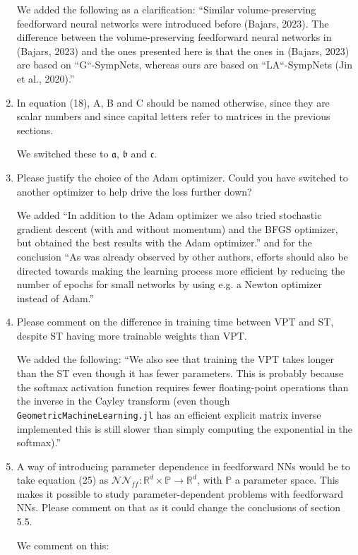 \documentclass{article}
\begin{document}
\begin{enumerate}
        {\color{mred} We added the following as a clarification: ``Similar volume-preserving feedforward neural networks were introduced before (Bajars, 2023). The difference between the volume-preserving feedforward neural networks in (Bajars, 2023) and the ones presented here is that the ones in (Bajars, 2023) are based on ``G``-SympNets, whereas ours are based on ``LA``-SympNets (Jin et al., 2020).''}
\item In equation (18), A, B and C should be named otherwise, since they are scalar numbers and since capital letters refer to matrices in the previous sections.

        {\color{mred} We switched these to $\mathfrak{a}$, $\mathfrak{b}$ and $\mathfrak{c}$.}
\item Please justify the choice of the Adam optimizer. Could you have switched to another optimizer to help drive the loss further down?

        {\color{mred} We added ``In addition to the Adam optimizer we also tried stochastic gradient descent (with and without momentum) and the BFGS optimizer, but obtained the best results with the Adam optimizer.'' and for the conclusion ``As was already observed by other authors, efforts should also be directed towards making the learning process more efficient by reducing the number of epochs for small networks by using e.g. a Newton optimizer instead of Adam.''}
\item Please comment on the difference in training time between VPT and ST, despite ST having more trainable weights than VPT.

        {\color{mred} We added the following: ``We also see that training the VPT takes longer than the ST even though it has fewer parameters. This is probably because the softmax activation function requires fewer floating-point operations than the inverse in the Cayley transform (even though \texttt{GeometricMachineLearning.jl} has an efficient explicit matrix inverse implemented this is still slower than simply computing the exponential in the softmax).''}

\item A way of introducing parameter dependence in feedforward NNs would be to take equation (25) as $\mathcal{NN}_{ff}: \mathbb{R}^d\times\mathbb{P}\to\mathbb{R}^d$, with $\mathbb{P}$ a parameter space. This makes it possible to study parameter-dependent problems with feedforward NNs. Please comment on that as it could change the conclusions of section 5.5.
        {\color{mred} We comment on this: 
        
}
\end{enumerate}
\end{document}
